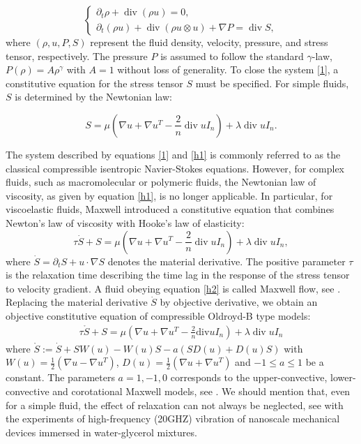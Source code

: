 \documentclass[10pt,reqno]{amsart}
\numberwithin{equation}{section}
\begin{document}
	\begin{equation} \label{1}
		\begin{cases}
			\partial_t \rho + \operatorname{div}(\rho u) = 0, \\[1mm]
			\partial_t (\rho u) + \operatorname{div}(\rho u \otimes u) + \nabla P = \operatorname{div} S,
		\end{cases}
	\end{equation}
	where \((\rho, u, P, S)\) represent the fluid density, velocity, pressure, and stress tensor, respectively. The pressure \(P\) is assumed to follow the standard \(\gamma\)-law, \(P(\rho) = A \rho^\gamma\) with \(A =1\) without loss of generality. To close the system \eqref{1}, a constitutive equation for the stress tensor \(S\) must be specified. For simple fluids, \(S\) is determined by the Newtonian law:
	
	\begin{equation}\label{h1}
		S = \mu \left( \nabla u + \nabla u^T - \frac{2}{n} \operatorname{div} u I_n \right) + \lambda \operatorname{div} u I_n.
	\end{equation}
	
	The system described by equations \eqref{1} and \eqref{h1} is commonly referred to as the classical compressible isentropic Navier-Stokes equations. However, for complex fluids, such as macromolecular or polymeric fluids, the Newtonian law of viscosity, as given by equation \eqref{h1}, is no longer applicable. In particular, for viscoelastic fluids, Maxwell \cite{maxwell1867iv} introduced a constitutive equation that combines Newton's law of viscosity with Hooke's law of elasticity:
	\begin{equation}\label{h2}
		\tau \dot{S} + S = \mu \left( \nabla u + \nabla u^T - \frac{2}{n} \operatorname{div} u I_n \right) + \lambda \operatorname{div} u I_n,
	\end{equation}
	where \(\dot{S} = \partial_t S + u \cdot \nabla S\) denotes the material derivative. The positive parameter $\tau$ is the relaxation time describing the time lag in the response of the stress tensor to velocity gradient. A fluid obeying equation \eqref{h2} is called Maxwell flow, see \cite{maxwell1867iv}. Replacing the material derivative $\dot S$ by objective derivative, we obtain an objective constitutive equation of compressible Oldroyd-B  type models:
	\begin{align}\label{h3}
		\tau \mathring {S}+S=\mu (\nabla u+\nabla u^T-\frac{2}{n} \mathrm{div} u I_n)+\lambda \operatorname{div} u I_n
	\end{align}
	where $\mathring S:=\dot S+S W(u)-W(u)S-a(S D(u)+D(u)S)$ with $W(u)=\frac{1}{2}(\nabla u-\nabla u^T)$, $D(u)=\frac{1}{2} (\nabla u+\nabla u^T)$ and $-1\le a \le 1$ be a constant. The parameters $a=1, -1, 0$  corresponds to the upper-convective, lower-convective and corotational Maxwell models, see \cite{maxwell1867iv}.
	We should mention that,  even for a simple fluid, the effect of relaxation can not always be neglected, see \cite{pelton2013viscoelastic} with the experiments of high-frequency (20GHZ) vibration of nanoscale mechanical devices immersed in water-glycerol mixtures.  
	
\end{document}
